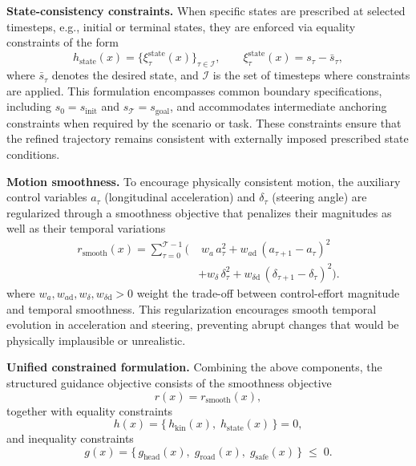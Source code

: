 \documentclass[10pt,twocolumn,letterpaper]{article}
\theoremstyle{plain}
\theoremstyle{remark}
\renewcommand{\paragraph}[1]{\vspace{.5em}\noindent\textbf{#1.}}
\begin{document}
\paragraph{State-consistency constraints}
When specific states are prescribed at selected timesteps, e.g., initial or terminal states, they are enforced via equality constraints of the form
\[
h_{\mathrm{state}}(x)
=
\bigl\{
\xi^{\mathrm{state}}_\tau(x)
\bigr\}_{\tau \in \mathcal{I}},
\qquad
\xi^{\mathrm{state}}_\tau(x)
=
s_\tau - \bar{s}_\tau,
\]
where \(\bar{s}_\tau\) denotes the desired state, and \(\mathcal{I}\) is the set of timesteps where constraints are applied. This formulation encompasses common boundary specifications,
including \(s_0 = s_{\mathrm{init}}\) and
\(s_{\mathcal{T}} = s_{\mathrm{goal}}\), and accommodates intermediate anchoring constraints when required by the scenario or task.  These constraints ensure that the refined trajectory remains consistent with externally imposed prescribed state conditions.

\paragraph{Motion smoothness}
To encourage physically consistent motion, the auxiliary control
variables \(a_\tau\) (longitudinal acceleration) and
\(\delta_\tau\) (steering angle) are regularized through a
smoothness objective that penalizes their magnitudes as well as their temporal variations
\[
\begin{aligned}
r_{\mathrm{smooth}}(x)
=
\sum_{\tau=0}^{\mathcal{T}-1}
\bigl(
&\;w_a\, a_\tau^2
+ w_{a\mathrm{d}}\, (a_{\tau+1}-a_\tau)^2 \\
&+ w_\delta\, \delta_\tau^2
+ w_{\delta\mathrm{d}}\, (\delta_{\tau+1}-\delta_\tau)^2
\bigr).
\end{aligned}
\]
where \(w_a, w_{a\mathrm{d}}, w_\delta, w_{\delta\mathrm{d}}>0\)
weight the trade-off between control-effort magnitude and temporal smoothness.  
This regularization encourages smooth temporal evolution in acceleration
and steering, preventing abrupt changes that would be physically implausible or unrealistic.

\paragraph{Unified constrained formulation}
Combining the above components, the structured guidance objective consists of the smoothness objective
\[
r(x)=r_{\mathrm{smooth}}(x),
\]
together with equality constraints
\[
h(x)=\{\,h_{\mathrm{kin}}(x),\; h_{\mathrm{state}}(x)\,\}=0,
\]
and inequality constraints
\[
g(x)=
\{\,g_{\mathrm{head}}(x),\;
g_{\mathrm{road}}(x),\;
g_{\mathrm{safe}}(x)\,\}
\;\le\; 0.
\]
\end{document}
